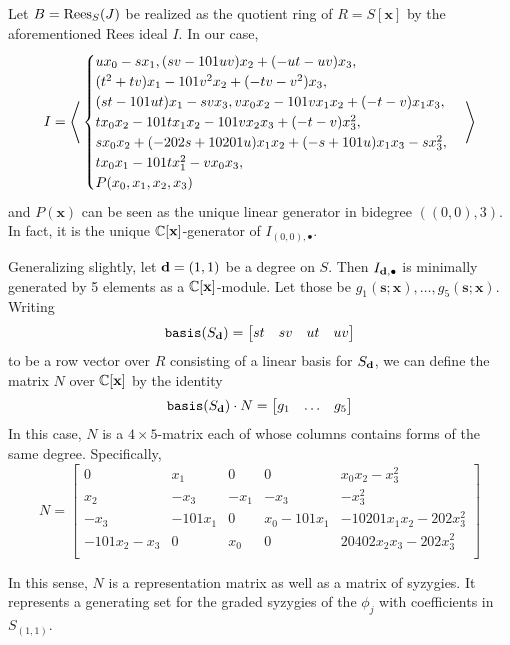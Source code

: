 \documentclass[fleqn,reqno]{amsart}
\begin{document}
\begin{example}[$\mt{ex201}$]
Let $B=\operatorname{Rees}_S(J)$ be realized as the quotient ring of $R=S[\mathbf x]$
by the aforementioned Rees ideal $I$.
In our case,
\[
	I=\Bigg\langle
	\begin{cases}
	u {x}_{0}-s {x}_{1},
	(s v-101 u v) {x}_{2}+(-u t-u v){x}_{3},\\
	(t^{2}+t v) {x}_{1}-101 v^{2} {x}_{2}+(-t v-v^{2}) {x}_{3},\\
	(s t-101 ut) {x}_{1}-s v {x}_{3},v {x}_{0} {x}_{2}-101 v {x}_{1} {x}_{2}+(-t-v) {x}_{1}{x}_{3},\\
  	t {x}_{0} {x}_{2}-101 t {x}_{1} {x}_{2}-101 v {x}_{2} {x}_{3}+(-t-v){x}_{3}^{2},\\
  	s {x}_{0} {x}_{2}+(-202 s+10201 u) {x}_{1} {x}_{2}+(-s+101 u){x}_{1} {x}_{3}-s {x}_{3}^{2},\\
	t {x}_{0} {x}_{1}-101 t {x}_{1}^{2}-v {x}_{0}{x}_{3},\\P(x_0,x_1,x_2,x_3)
	\end{cases}\Bigg\rangle
\]
and $P(\mathbf x)$ can be seen as the unique linear generator in bidegree $((0,0),3)$.
In fact, it is the unique $\mathbb{C}[\mathbf x]$-generator of $I_{(0,0),\bullet}$.

Generalizing slightly, let $\mathbf d=(1,1)$ be a degree on $S$.
Then $I_{\mathbf d,\bullet}$ is minimally generated by 5 elements as a $\mathbb{C}[\mathbf x]$-module.
Let those be $g_1(\mathbf s;\mathbf x),\ldots,g_5(\mathbf s;\mathbf x)$.
Writing
\[
	\mathop{\tt basis}(S_\mathbf d)=\begin{bmatrix}st& sv& ut& uv\end{bmatrix}
\]
to be a row vector over $R$ consisting of a linear basis for $S_\mathbf d$,
we can define the matrix $N$ over $\mathbb{C}[\mathbf x]$ by the identity
\[
	\mathop{\tt basis}(S_\mathbf d)\cdot N=\begin{bmatrix}g_1&\ldots&g_5\end{bmatrix}
\]
In this case, $N$ is a $4\times5$-matrix each of whose columns contains forms of the same degree.
Specifically,
\[
	N=\begin{bmatrix}0&
	       {x}_{1}&
	       0&
	       0&
	       {x}_{0} {x}_{2}-{x}_{3}^{2}\\
	       {x}_{2}&
	       {-{x}_{3}}&
	       {-{x}_{1}}&
	       {-{x}_{3}}&
	       {-{x}_{3}^{2}}\\
	       {-{x}_{3}}&
	       {-101 {x}_{1}}&
	       0&
	       {x}_{0}-101 {x}_{1}&
	       -10201 {x}_{1} {x}_{2}-202 {x}_{3}^{2}\\
	       -101 {x}_{2}-{x}_{3}&
	       0&
	       {x}_{0}&
	       0&
	       20402 {x}_{2} {x}_{3}-202 {x}_{3}^{2}\\
	       \end{bmatrix}
\]

In this sense, $N$ is a representation matrix as well as a matrix of syzygies.
It represents a generating set for the graded syzygies of the $\phi_j$ with coefficients
in $S_{(1,1)}$.
\end{example}
\end{document}

